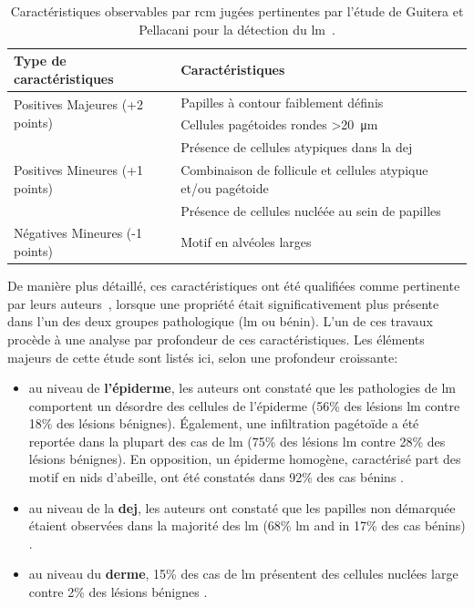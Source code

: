 \begin{table}[H]
\centering
\begin{tabular}{ll}
\toprule
Type de caractéristiques                        & Caractéristiques                                              \\\hline
\multirow{2}{*}{Positives Majeures (+2 points)} & Papilles à contour faiblement définis                         \\\cline{2-2}
                                                & Cellules pagétoides rondes >\SI{20}{\micro\metre}             \\\hline
\multirow{3}{*}{Positives Mineures (+1 points)} & Présence de cellules atypiques dans la \gls{dej}              \\\cline{2-2}
                                                & Combinaison de follicule et cellules atypique et/ou pagétoide \\\cline{2-2}
                                                & Présence de cellules nucléée au sein de papilles              \\\hline
Négatives Mineures (-1 points)                  & Motif en alvéoles larges                                      \\
\bottomrule
\end{tabular}
\caption{Caractéristiques observables par \gls{rcm} jugées pertinentes par l'étude de Guitera et Pellacani pour la détection du \gls{lm}~\cite{Guitera2010}.}
\label{tab:rcm_algorithm_lentigo}
\end{table}\par
 
De manière plus détaillé, ces caractéristiques ont été qualifiées comme pertinente par leurs auteurs~\cite{Pellacani2007, Guitera2010}, lorsque une propriété était significativement plus présente dans l'un des deux groupes pathologique (\gls{lm} ou bénin). L'un de ces travaux~\cite{Guitera2010} procède à une analyse par profondeur de ces caractéristiques. Les éléments majeurs de cette étude sont listés ici, selon une profondeur croissante:
\begin{itemize}
    \item au niveau de \textbf{l'épiderme}, les auteurs ont constaté que les pathologies de \gls{lm} comportent un désordre des cellules de l'épiderme (56\% des lésions \gls{lm} contre 18\% des lésions bénignes). Également, une infiltration pagétoïde a été reportée dans la plupart des cas de \gls{lm}  (75\% des lésions \gls{lm} contre 28\% des lésions bénignes). En opposition, un épiderme homogène, caractérisé part des motif en nids d'abeille, ont été constatés dans 92\% des cas bénins .
    \item au niveau de la \textbf{\gls{dej}}, les auteurs ont constaté que les papilles non démarquée étaient observées dans la majorité des \gls{lm} (68\% \gls{lm} and in 17\% des cas bénins) .
    \item au niveau du \textbf{derme}, 15\% des cas de \gls{lm} présentent des cellules nuclées large contre 2\% des lésions bénignes .
\end{itemize}\par

